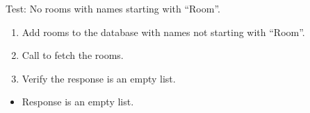 \documentclass[letterpaper,10pt,english]{sphinxmanual}
\begin{document}
\begin{fulllineitems}
\label{\detokenize{test:test.test_room.test_list_rooms_room_no_matches}}
\pysigstartsignatures
\pysiglinewithargsret
{}
{}
{}
\pysigstopsignatures
\sphinxAtStartPar
Test: No rooms with names starting with “Room”.
\begin{description}
\begin{enumerate}
%
\item {} 
\sphinxAtStartPar
Add rooms to the database with names not starting with “Room”.

\item {} 
\sphinxAtStartPar
Call  to fetch the rooms.

\item {} 
\sphinxAtStartPar
Verify the response is an empty list.

\end{enumerate}

\begin{itemize}
\item {} 
\sphinxAtStartPar
Response is an empty list.

\end{itemize}

\end{description}

\end{fulllineitems}

\end{document}

